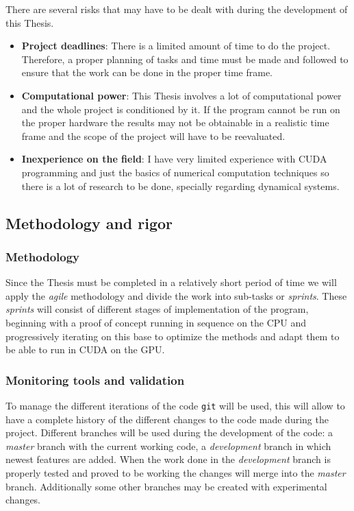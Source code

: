 There are several risks that may have to be dealt with during the development of this Thesis.

\begin{itemize}
    \item \textbf{Project deadlines}: There is a limited amount of time to do
        the project. Therefore, a proper planning of tasks and time must be made
        and followed to ensure that the work can be done in the proper time
        frame.
    \item \textbf{Computational power}: This Thesis involves a lot of
        computational power and the whole project is conditioned by it. If the
        program cannot be run on the proper hardware the results may not be
        obtainable in a realistic time frame and the scope of the project will
        have to be reevaluated.
    \item \textbf{Inexperience on the field}: I have very limited experience
        with CUDA programming and just the basics of numerical computation
        techniques so there is a lot of research to be done, specially regarding
        dynamical systems.
\end{itemize}

\pagebreak
\subsection{Methodology and rigor}

\subsubsection{Methodology}

Since the Thesis must be completed in a relatively short period of time we will
apply the \emph{agile} methodology and divide the work into sub-tasks or
\emph{sprints}. These \emph{sprints} will consist of different stages of
implementation of the program, beginning with a proof of concept running in
sequence on the CPU and progressively iterating on this base to optimize the
methods and adapt them to be able to run in CUDA on the GPU.

\subsubsection{Monitoring tools and validation}

To manage the different iterations of the code \texttt{git} will be used,
this will allow to have a complete history of the different changes to the code
made during the project. Different branches will be used during the development
of the code: a \emph{master} branch with the current working code, a
\emph{development} branch in which newest features are added. When the work done
in the \emph{development} branch is properly tested and proved to be working the
changes will merge into the \emph{master} branch. Additionally some
other branches may be created with experimental changes.


